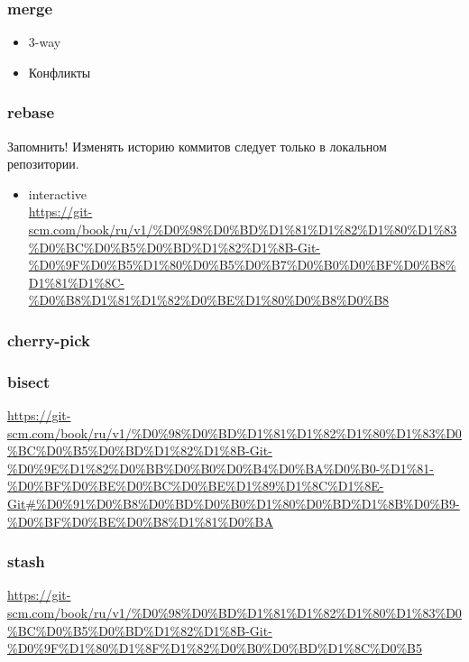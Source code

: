 \begin{frame}
\frametitle{merge}
\label{sec-3-7}
\begin{itemize}

\item 3-way
\label{sec-3-7-1}%

\item Конфликты
\label{sec-3-7-2}%
\end{itemize} %
\end{frame}
\begin{frame}
\frametitle{rebase}
\label{sec-3-8}

Запомнить! Изменять историю коммитов следует только в локальном репозитории.
\begin{itemize}

\item interactive\\
\label{sec-3-8-1}%
\href{https://git-scm.com/book/ru/v1/%D0%98%D0%BD%D1%81%D1%82%D1%80%D1%83%D0%BC%D0%B5%D0%BD%D1%82%D1%8B-Git-%D0%9F%D0%B5%D1%80%D0%B5%D0%B7%D0%B0%D0%BF%D0%B8%D1%81%D1%8C-%D0%B8%D1%81%D1%82%D0%BE%D1%80%D0%B8%D0%B8}{https://git-scm.com/book/ru/v1/\%D0\%98\%D0\%BD\%D1\%81\%D1\%82\%D1\%80\%D1\%83\%D0\%BC\%D0\%B5\%D0\%BD\%D1\%82\%D1\%8B-Git-\%D0\%9F\%D0\%B5\%D1\%80\%D0\%B5\%D0\%B7\%D0\%B0\%D0\%BF\%D0\%B8\%D1\%81\%D1\%8C-\%D0\%B8\%D1\%81\%D1\%82\%D0\%BE\%D1\%80\%D0\%B8\%D0\%B8}
\end{itemize} %
\end{frame}
\begin{frame}
\frametitle{cherry-pick}
\label{sec-3-9}
\end{frame}
\begin{frame}
\frametitle{bisect}
\label{sec-3-10}

\href{https://git-scm.com/book/ru/v1/%D0%98%D0%BD%D1%81%D1%82%D1%80%D1%83%D0%BC%D0%B5%D0%BD%D1%82%D1%8B-Git-%D0%9E%D1%82%D0%BB%D0%B0%D0%B4%D0%BA%D0%B0-%D1%81-%D0%BF%D0%BE%D0%BC%D0%BE%D1%89%D1%8C%D1%8E-Git#%D0%91%D0%B8%D0%BD%D0%B0%D1%80%D0%BD%D1%8B%D0%B9-%D0%BF%D0%BE%D0%B8%D1%81%D0%BA}{https://git-scm.com/book/ru/v1/\%D0\%98\%D0\%BD\%D1\%81\%D1\%82\%D1\%80\%D1\%83\%D0\%BC\%D0\%B5\%D0\%BD\%D1\%82\%D1\%8B-Git-\%D0\%9E\%D1\%82\%D0\%BB\%D0\%B0\%D0\%B4\%D0\%BA\%D0\%B0-\%D1\%81-\%D0\%BF\%D0\%BE\%D0\%BC\%D0\%BE\%D1\%89\%D1\%8C\%D1\%8E-Git\#\%D0\%91\%D0\%B8\%D0\%BD\%D0\%B0\%D1\%80\%D0\%BD\%D1\%8B\%D0\%B9-\%D0\%BF\%D0\%BE\%D0\%B8\%D1\%81\%D0\%BA}
\end{frame}
\begin{frame}
\frametitle{stash}
\label{sec-3-11}

\href{https://git-scm.com/book/ru/v1/%D0%98%D0%BD%D1%81%D1%82%D1%80%D1%83%D0%BC%D0%B5%D0%BD%D1%82%D1%8B-Git-%D0%9F%D1%80%D1%8F%D1%82%D0%B0%D0%BD%D1%8C%D0%B5}{https://git-scm.com/book/ru/v1/\%D0\%98\%D0\%BD\%D1\%81\%D1\%82\%D1\%80\%D1\%83\%D0\%BC\%D0\%B5\%D0\%BD\%D1\%82\%D1\%8B-Git-\%D0\%9F\%D1\%80\%D1\%8F\%D1\%82\%D0\%B0\%D0\%BD\%D1\%8C\%D0\%B5}
\end{frame}
